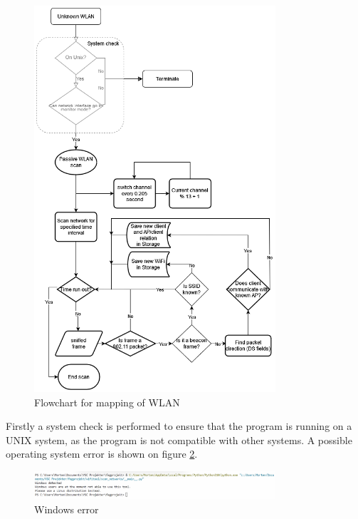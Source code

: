 \begin{figure}[!htbp]
    \centering
    \includegraphics[width=0.8\textwidth]{Latex-Files/Billeder/Flowcharts/network_flowchart.png}
    \caption{Flowchart for mapping of WLAN}
    \label{Flowchart}
\end{figure}

\newpage

Firstly a system check is performed to ensure that the program is running on a UNIX system, as the program is not compatible with other systems. A possible operating system error is shown on figure \ref{W_error}.

\begin{figure}[!htbp]
    \centering
    \includegraphics[width=0.8\textwidth]{Latex-Files/Billeder/Implementation/Windows_error.png}
    \caption{Windows error}
    \label{W_error}
\end{figure}

